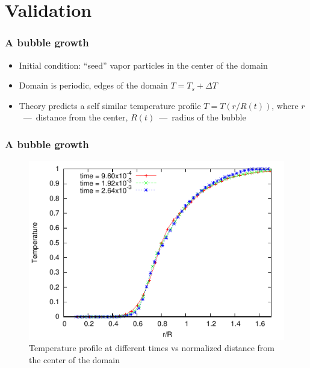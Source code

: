\section{Validation}
\begin{frame}
  \frametitle{A bubble growth}
  \begin{itemize}
  \item Initial condition: ``seed'' vapor particles in the center of
    the domain
  \item Domain is periodic, edges of the domain $T=T_s +
    \Delta T$
  \item Theory predicts a self similar temperature profile $T =
    T(r/R(t))$, where $r$~---~distance from the center, $R(t)$~---~radius of
    the bubble
  \end{itemize}
\end{frame}

\begin{frame}
  \frametitle{A bubble growth}
  \begin{figure}
    \centering
    \includegraphics{gnuplot/self.pdf}
    \caption{Temperature profile at different times vs normalized
      distance from the center of the domain}
    \label{fig:self}
  \end{figure}
\end{frame}

